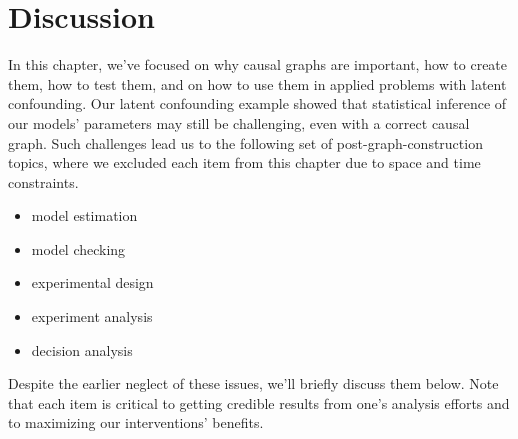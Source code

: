 \section{Discussion}
\label{sec:discussion}

In this chapter, we've focused on why causal graphs are important, how to create them, how to test them, and on how to use them in applied problems with latent confounding.
Our latent confounding example showed that statistical inference of our models' parameters may still be challenging, even with a correct causal graph.
Such challenges lead us to the following set of post-graph-construction topics, where we excluded each item from this chapter due to space and time constraints.
\begin{itemize}
   \item model estimation
   \item model checking
   \item experimental design
   \item experiment analysis
   \item decision analysis
\end{itemize}
Despite the earlier neglect of these issues, we'll briefly discuss them below.
Note that each item is critical to getting credible results from one's analysis efforts and to maximizing our interventions' benefits.
